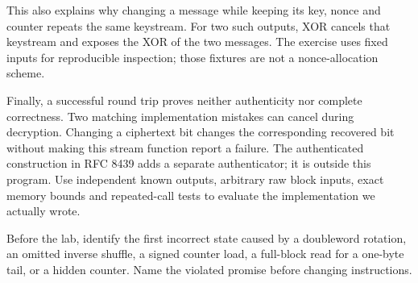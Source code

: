 This also explains why changing a message while keeping its key, nonce and
counter repeats the same keystream. For two such outputs, XOR cancels that
keystream and exposes the XOR of the two messages. The exercise uses fixed
inputs for reproducible inspection; those fixtures are not a nonce-allocation
scheme.

Finally, a successful round trip proves neither authenticity nor complete
correctness. Two matching implementation mistakes can cancel during decryption.
Changing a ciphertext bit changes the corresponding recovered bit without
making this stream function report a failure. The authenticated construction in
RFC 8439 adds a separate authenticator; it is outside this program.
Use independent known outputs, arbitrary raw block inputs, exact memory bounds
and repeated-call tests to evaluate the implementation we actually wrote.

Before the lab, identify the first incorrect state caused by a doubleword
rotation, an omitted inverse shuffle, a signed counter load, a full-block read
for a one-byte tail, or a hidden counter. Name the violated promise before
changing instructions.
